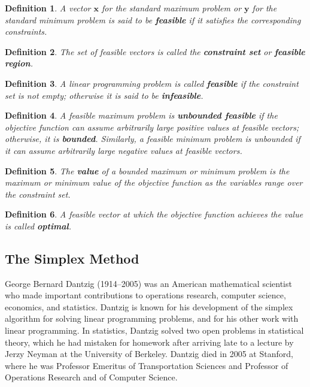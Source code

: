 \documentclass[letterpaper,10pt]{article}
\newcommand{\bvec}[1]{\ensuremath{\mathbf{#1}}}
\newtheorem{df}{Definition}[section]
\begin{document}
\begin{df} 
A vector $\bvec{x}$ for the standard maximum problem or $\bvec{y}$ for the standard minimum problem is said to be {\bf feasible} if it satisfies the corresponding constraints.
\end{df}

\begin{df}
The set of feasible vectors is called the {\bf constraint set} or {\bf feasible region}.
\end{df}

\begin{df}
A linear programming problem is called {\bf feasible} if the constraint set is not empty;
otherwise it is said to be {\bf infeasible}.
\end{df}

\begin{df}
A feasible maximum problem is {\bf unbounded feasible} if the objective function can assume arbitrarily large positive values at feasible vectors; otherwise, it is {\bf bounded}.  Similarly, a feasible minimum problem is unbounded if it can assume arbitrarily large negative values at feasible vectors.
\end{df}

\begin{df}
The {\bf value} of a bounded maximum or minimum problem is the maximum or minimum value of the objective function as the variables range over the constraint set.
\end{df}

\begin{df}
A feasible vector at which the objective function achieves the value is called {\bf optimal}.
\end{df}

\subsection{The Simplex Method}

George Bernard Dantzig (1914--2005) was an American mathematical scientist who made important contributions to operations research, computer science, economics, and statistics.  Dantzig is known for his development of the simplex algorithm for solving linear programming problems, and for his other work with linear programming. In statistics, Dantzig solved two open problems in statistical theory, which he had mistaken for homework after arriving late to a lecture by Jerzy Neyman at the University of Berkeley.  Dantzig died in 2005 at Stanford, where he was Professor Emeritus of Transportation Sciences and Professor of Operations Research and of Computer Science.
\end{document}
